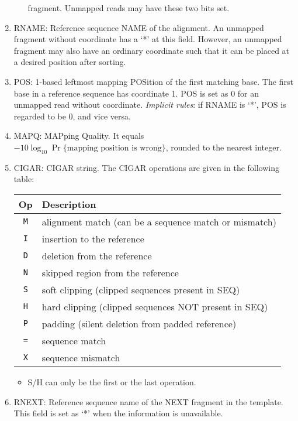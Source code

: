 \documentclass[10pt]{article}
\begin{document}
\begin{enumerate}
\begin{itemize}
    fragment. Unmapped reads may have these two bits set.
  \end{itemize}
\item {\sf RNAME}: Reference sequence NAME of the alignment. An unmapped
  fragment without coordinate has a `*' at this field. However, an
  unmapped fragment may also have an ordinary coordinate such that it
  can be placed at a desired position after sorting.
\item {\sf POS}: 1-based leftmost mapping POSition of the first matching
  base. The first base in a reference sequence has coordinate 1. {\sf
    POS} is set as 0 for an unmapped read without
  coordinate. \emph{Implicit rules}: if {\sf RNAME} is `*', {\sf POS} is
  regarded to be 0, and vice versa.
\item {\sf MAPQ}: MAPping Quality. It equals
  $-10\log_{10}\Pr\{\mbox{mapping position is wrong}\}$, rounded to the
  nearest integer.
\item {\sf CIGAR}: CIGAR string. The CIGAR operations are given in the
  following table:
  \begin{center}
  \begin{tabular}{cl}
  \hline
  Op & Description\\
  \hline
  {\tt M} & alignment match (can be a sequence match or mismatch)\\
  {\tt I} & insertion to the reference \\
  {\tt D} & deletion from the reference \\
  {\tt N} & skipped region from the reference \\
  {\tt S} & soft clipping (clipped sequences present in {\sf SEQ})\\
  {\tt H} & hard clipping (clipped sequences NOT present in {\sf SEQ})\\
  {\tt P} & padding (silent deletion from padded reference)\\
  {\tt =} & sequence match \\
  {\tt X} & sequence mismatch \\
  \hline
  \end{tabular}
  \end{center}
  \begin{itemize}
  \item S/H can only be the first or the last operation.
  \end{itemize}
\item {\sf RNEXT}: Reference sequence name of the NEXT fragment in the
  template. This field is set as `*' when the information is
  unavailable.

\end{enumerate}
\end{document}
